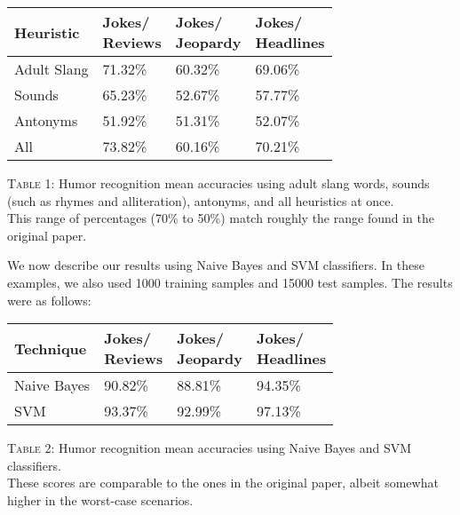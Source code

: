 \documentclass[11pt,a4paper]{article}
\begin{document}
\begin{center}
  \begin{tabular}{|p{1.5cm}|p{1.5cm}|p{1.5cm}|p{1.5cm}|}
    \hline
    Heuristic & \thead{Jokes/ \\ Reviews} & \thead{Jokes/ \\ Jeopardy} & \thead{Jokes/ \\ Headlines} \\
    \hline
    Adult Slang & 71.32\% & 60.32\% & 69.06\% \\
    \hline
    Sounds & 65.23\% & 52.67\% & 57.77\% \\
    \hline
    Antonyms & 51.92\% & 51.31\% & 52.07\% \\
    \hline
    All & 73.82\% & 60.16\% & 70.21\% \\
    \hline
\end{tabular}
\end{center}

\noindent \textsc{Table 1}: Humor recognition mean accuracies using adult slang words, sounds (such as rhymes and alliteration), antonyms, and all heuristics at once.\\

This range of percentages (70\% to 50\%) match roughly the range found in the original paper.

We now describe our results using Naive Bayes and SVM classifiers. In these examples, we also used 1000 training samples and 15000 test samples. The results were as follows:

\begin{center}
  \begin{tabular}{|p{1.5cm}|p{1.5cm}|p{1.5cm}|p{1.5cm}|}
    \hline
    Technique & \thead{Jokes/ \\ Reviews} & \thead{Jokes/ \\ Jeopardy} & \thead{Jokes/ \\ Headlines} \\
    \hline
    Naive Bayes & 90.82\% & 88.81\% & 94.35\% \\
    \hline
    SVM & 93.37\% & 92.99\% & 97.13\% \\
    \hline
\end{tabular}
\end{center}

\noindent \textsc{Table 2}: Humor recognition mean accuracies using Naive Bayes and SVM classifiers.\\

These scores are comparable to the ones in the original paper, albeit somewhat higher in the worst-case scenarios.
\end{document}
